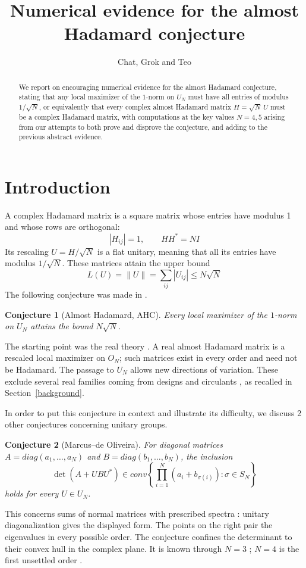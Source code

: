 \documentclass[11pt,a4paper]{article}
\title{Numerical evidence for the almost Hadamard conjecture}
\author{Chat, Grok and Teo}
\date{}
\newtheorem*{introconj}{Conjecture}
\begin{document}
\maketitle
\begin{abstract}
We report on encouraging numerical evidence for the almost Hadamard conjecture, stating that any local maximizer of the $1$-norm on $U_N$ must have all entries of modulus $1/\sqrt{N}$, or equivalently that every complex almost Hadamard matrix $H=\sqrt{N}\,U$ must be a complex Hadamard matrix, with computations at the key values $N=4,5$ arising from our attempts to both prove and disprove the conjecture, and adding to the previous abstract evidence.
\end{abstract}
\begingroup
\color{magenta}\hypersetup{linkcolor=magenta}
\setlength{\parskip}{0pt}
\renewcommand{\addvspace}[1]{\vspace{3pt}}
\tableofcontents
\endgroup
\section*{Introduction}
A complex Hadamard matrix is a square matrix whose entries have modulus
1 and whose rows are orthogonal:
\[
 |H_{ij}|=1,\qquad HH^*=NI
\]
Its rescaling $U=H/\sqrt N$ is a flat unitary, meaning that all its
entries have modulus $1/\sqrt{N}$. These matrices attain the upper bound
\[
 L(U)=\|U\|=\sum_{ij}|U_{ij}|\le N\sqrt N
\]
The following conjecture was made in \cite{BN}.

\begin{introconj}[Almost Hadamard, AHC]
Every local maximizer of the $1$-norm on $U_N$ attains the bound
$N\sqrt N$.
\end{introconj}

The starting point was the real theory \cite{BCS,BNZ}. A real almost
Hadamard matrix is a rescaled local maximizer on $O_N$; such matrices
exist in every order and need not be Hadamard. The passage to $U_N$
allows new directions of variation. These exclude several real
families coming from designs and circulants \cite{BN}, as recalled in
Section~\ref{background}.

\begin{samepage}
In order to put this conjecture in context and illustrate its difficulty,
we discuss 2 other conjectures concerning unitary groups.

\begin{introconj}[Marcus--de Oliveira]
For diagonal matrices $A=diag(a_1,\ldots,a_N)$ and
$B=diag(b_1,\ldots,b_N)$, the inclusion
\[
 \det(A+UBU^*)\in conv
 \left\{\prod_{i=1}^N(a_i+b_{\sigma(i)}):\sigma\in S_N\right\}
\]
holds for every $U\in U_N$.
\end{introconj}
\end{samepage}
This concerns sums of normal matrices with prescribed spectra
\cite{M,O}: unitary diagonalization gives the displayed form. The points
on the right pair the eigenvalues in every possible order. The
conjecture confines the determinant to their convex hull in the complex
plane. It is known through $N=3$ \cite{BMP}; $N=4$ is the first
unsettled order \cite{BP,MM}.
\end{document}
